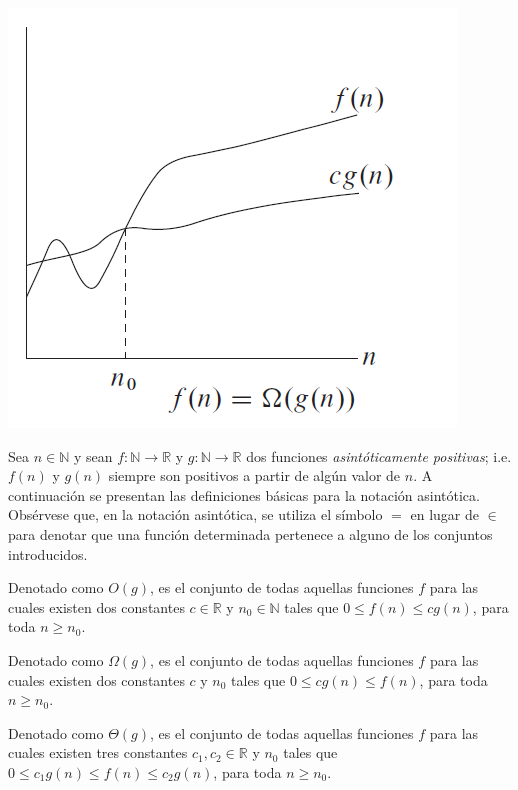 {    
    \includegraphics[width=\marginparwidth]{figuras/big-omega}
}

Sea $n\in\mathbb{N}$ y sean $f:\mathbb{N}\to\mathbb{R}$ y $g:\mathbb{N}\to\mathbb{R}$
dos funciones \emph{asintóticamente positivas}; i.e. $f(n)$ y $g(n)$
siempre son positivos a partir de algún valor de $n$. A continuación
se presentan las definiciones básicas para la notación asintótica.
Obsérvese que, en la notación asintótica, se utiliza el símbolo $=$
en lugar de $\in$ para denotar que una función determinada pertenece
a alguno de los conjuntos introducidos.

\begin{defn}[O grande]
    Denotado como $O(g)$, es el conjunto de todas aquellas funciones
    $f$ para las cuales existen dos constantes $c\in\mathbb{R}$ y $n_{0}\in\mathbb{N}$
    tales que $0\le f(n)\leq c g(n)$, para toda $n\geq n_{0}$. 
\end{defn}

\begin{defn}
    Denotado como $\Omega(g)$, es el conjunto de todas aquellas funciones
    $f$ para las cuales existen dos constantes $c$ y $n_{0}$ tales
    que $0\le c g(n)\leq f(n)$, para toda $n\geq n_{0}$.
\end{defn}

\begin{defn}
    Denotado como $\Theta(g)$, es el conjunto de todas aquellas funciones
    $f$ para las cuales existen tres constantes $c_{1},c_{2}\in\mathbb{R}$
    y $n_{0}$ tales que $0\le c_{1} g(n)\leq f(n)\leq c_{2} g(n)$,
    para toda $n\geq n_{0}$.
\end{defn}

